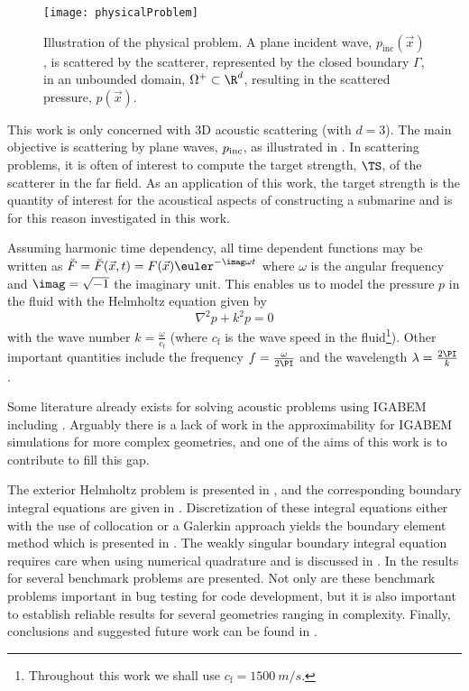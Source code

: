 \begin{figure}
	\centering
	\texttt{[image: physicalProblem]}
	\caption{Illustration of the physical problem. A plane incident wave, $p_{\mathrm{inc}}(\vec{x})$, is scattered by the scatterer, represented by the closed boundary $\Gamma$, in an unbounded domain, $\Omega^+\subset\R^d$, resulting in the scattered pressure, $p(\vec{x})$.}
	\label{Fig3:physicalProblem}
\end{figure}
This work is only concerned with 3D acoustic scattering (with $d=3$). The main objective is scattering by plane waves, $p_{\rm inc}$, as illustrated in . In scattering problems, it is often of interest to compute the target strength, $\TS$, of the scatterer in the far field. As an application of this work, the target strength is the quantity of interest for the acoustical aspects of constructing a submarine and is for this reason investigated in this work.

Assuming harmonic time dependency, all time dependent functions may be written as $\breve{F}=\breve{F}(\vec{x},t) = F(\vec{x})\euler^{-\imag\omega t}$ where $\omega$ is the angular frequency and $\imag = \sqrt{-1}$ the imaginary unit. This enables us to model the pressure $p$ in the fluid with the Helmholtz equation given by
\begin{equation}\label{Eq3:HelmholtzEquationIntro}
	\nabla^2 p + k^2 p = 0
\end{equation}
with the wave number $k=\frac{\omega}{c_{\mathrm{f}}}$ (where $c_{\mathrm{f}}$ is the wave speed in the fluid\footnote{Throughout this work we shall use $c_{\mathrm{f}}=\SI{1500}{m/s}$.}). Other important quantities include the frequency $f=\frac{\omega}{2\PI}$ and the wavelength $\lambda = \frac{2\PI}{k}$.

Some literature already exists for solving acoustic problems using IGABEM including \cite{Simpson2014aib,Keuchel2017eoh,Peake2013eib,Peake2014eai,Peake2015eib,Coox2017aii, Taus2015iaf,Dolz2016aib,Dolz2018afi,Sun2019dib,Wu2020iib}. Arguably there is a lack of work in the approximability for IGABEM simulations for more complex geometries, and one of the aims of this work is to contribute to fill this gap.

The exterior Helmholtz problem is presented in , and the corresponding boundary integral equations are given in . Discretization of these integral equations either with the use of collocation or a Galerkin approach yields the boundary element method which is presented in . The weakly singular boundary integral equation requires care when using numerical quadrature and is discussed in . In  the results for several benchmark problems are presented. Not only are these benchmark problems important in bug testing for code development, but it is also important to establish reliable results for several geometries ranging in complexity. Finally, conclusions and suggested future work can be found in . 

